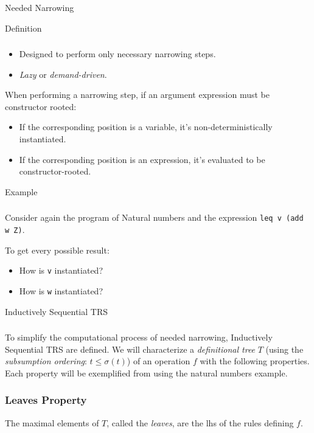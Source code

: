 \documentclass{beamer}
\begin{document}
\begin{section}{Needed Narrowing}
  \begin{subsection}{Definition}
    \begin{frame}
      \frametitle{\subsecname}
      
      \begin{itemize}
        \item Designed to perform only necessary narrowing steps.
        \item \textit{Lazy} or \textit{demand-driven}.
      \end{itemize}

      \bigskip
      When performing a narrowing step, if an argument expression must be constructor rooted:
      \begin{itemize}
        \item If the corresponding position is a variable, it's non-deterministically instantiated.
        \item If the corresponding position is an expression, it's evaluated to be constructor-rooted.
      \end{itemize}
      
    \end{frame}
  \end{subsection}
\begin{subsection}{Example}

\begin{frame}[fragile]
\frametitle{\subsecname}
Consider again the program of Natural numbers and the expression \verb|leq v (add w Z)|. 

\bigskip
To get every possible result:
\begin{itemize}
  \item How is \verb|v| instantiated?
  \item How is \verb|w| instantiated?
  
\end{itemize}

\end{frame}
\end{subsection}
\begin{subsection}{Inductively Sequential TRS}
  \begin{frame}[allowpagebreaks]
\frametitle{\subsecname}
To simplify the computational process of needed narrowing, Inductively Sequential TRS are defined. We will characterize a \textit{definitional tree} $T$ (using the \textit{subsumption ordering}: $t \leq \sigma (t)$) of an operation $f$ with the following properties. Each property will be exemplified from using the natural numbers example.
\end{frame}
\begin{frame}
[fragile]
\frametitle{Leaves Property} The maximal elements of $T$, called the \textit{leaves}, are the lhs of the rules defining $f$.


\end{frame}
\end{subsection}
\end{section}
\end{document}
